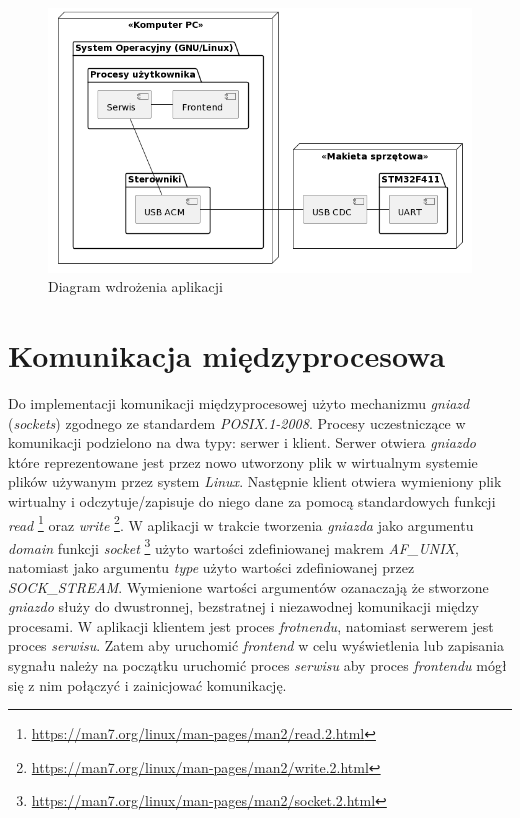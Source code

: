 \begin{figure}[h!]
    \centering 
    \includegraphics[scale=0.5]{pl/media/deployment.png}
    \caption{Diagram wdrożenia aplikacji}
    \label{fig:app_dpl}
\end{figure}

\newpage

\section{Komunikacja międzyprocesowa}

Do implementacji komunikacji międzyprocesowej użyto mechanizmu \textit{gniazd} 
(\textit{sockets}) zgodnego ze standardem \textit{POSIX.1-2008}.
Procesy uczestniczące w komunikacji podzielono
na dwa typy: serwer i klient. Serwer otwiera \textit{gniazdo} które reprezentowane jest przez
nowo utworzony plik w wirtualnym systemie plików używanym przez system \textit{Linux}. 
Następnie klient otwiera wymieniony plik wirtualny i odczytuje/zapisuje do niego dane za 
pomocą standardowych funkcji \textit{read} 
\footnote{\url{https://man7.org/linux/man-pages/man2/read.2.html}} oraz 
\textit{write} \footnote{\url{https://man7.org/linux/man-pages/man2/write.2.html}}.
W aplikacji w trakcie tworzenia \textit{gniazda} jako argumentu \textit{domain} funkcji
\textit{socket} \footnote{\url{https://man7.org/linux/man-pages/man2/socket.2.html}} 
użyto wartości zdefiniowanej makrem \textit{AF\_UNIX}, natomiast jako argumentu \textit{type}
użyto wartości zdefiniowanej przez \textit{SOCK\_STREAM}. Wymienione wartości argumentów 
ozanaczają że stworzone \textit{gniazdo} służy do dwustronnej, bezstratnej
i niezawodnej komunikacji między procesami.
W aplikacji klientem jest proces \textit{frotnendu}, natomiast serwerem jest proces \textit{serwisu}.
Zatem aby uruchomić \textit{frontend} w celu wyświetlenia lub zapisania sygnału należy na początku
uruchomić proces \textit{serwisu} aby proces \textit{frontendu} mógł się z nim połączyć i zainicjować komunikację.


